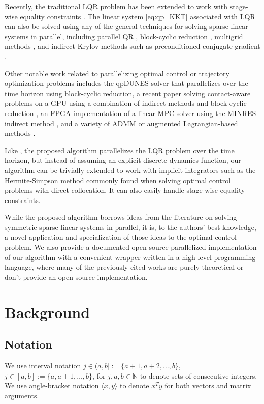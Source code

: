 \documentclass[../root.tex]{subfiles}
\newcommand{\0}{{\transparent{0} \resizebox{\mycellheight}{\mycellheight}{0}}}
\begin{document}
Recently, the traditional LQR problem has been extended to work with stage-wise
equality constraints \cite{brudigam_LinearTime_2020,yang_Equality_2020}. The linear
system \eqref{eq:qp_KKT} associated with LQR can also be solved using any of the
general techniques for solving sparse linear systems in parallel, including
parallel QR \cite{yang_Equality_2020}, block-cyclic reduction
\cite{hirshman_BCYCLIC_2010,gander_Cyclic_1997}, multigrid methods 
\cite{yang_BoomerAMG_2002,jones_Parallel_1997}, and indirect Krylov methods such as 
preconditioned conjugate-gradient \cite{anzt_Preconditioned_2017}.

Other notable work related to parallelizing optimal control or trajectory optimization problems
includes the qpDUNES solver \cite{frasch_Parallel_2015} that 
parallelizes over the time horizon using block-cyclic reduction, a recent paper solving 
contact-aware problems on a GPU using a combination of indirect methods and block-cyclic 
reduction \cite{pan_GPUbased_2019}, an FPGA implementation of a linear MPC solver using the 
MINRES indirect method \cite{jerez_Parallel_2011}, and a variety of ADMM or augmented 
Lagrangian-based methods \cite{kouzoupis_Block_2016, yu_Efficient_2017,alonso_Effective_2021,
zhou_Accelerated_2020,sindhwani_Sequential_2017}.

Like \cite{laine_Parallelizing_2019}, the proposed algorithm parallelizes the LQR problem over
the time horizon, but instead of assuming an explicit discrete dynamics function, our 
algorithm can be trivially extended to work with implicit integrators such as the 
Hermite-Simpson method commonly found when solving optimal control problems with direct 
collocation. It can also easily handle stage-wise equality constraints. 

While the proposed algorithm borrows ideas from the literature on solving symmetric sparse
linear systems in parallel, it is, to the authors' best knowledge, a novel application and
specialization of those ideas to the optimal control problem. We also provide a documented 
open-source parallelized implementation of our algorithm with a convenient wrapper written
in a high-level programming language, where many of the previously cited works are purely 
theoretical or don't provide an open-source implementation.

\section{Background} \label{sec:background}
\subsection{Notation}
We use interval notation $j \in (a,b] := \{a+1,a+2,\dots,b\}$, $j \in [a,b] :=
\{a,a+1,\dots,b\}$, for $j,a,b \in \mathbb{N}$ to denote sets of consecutive integers. 
We use angle-bracket notation $\langle x, y \rangle$ to denote $x^T y$ for both 
vectors and matrix arguments. 
\end{document}
